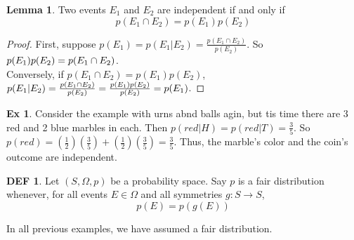 \documentclass{article}
\theoremstyle{definition}\newtheorem{definition}{DEF}
\theoremstyle{definition}\newtheorem{example}{Ex}
\theoremstyle{lemma}\newtheorem{lemma}{Lemma}
\theoremstyle{corrolary}\newtheorem{corrolary}{Cor}
\begin{document}
\begin{lemma}
Two events $E_1$ and $E_2$ are independent if and only if
\begin{equation}
p(E_1 \cap E_2) = p(E_1)p(E_2)
\end{equation}
\end{lemma}
\begin{proof}
First, suppose $p(E_1) = p(E_1 | E_2) = \frac{p(E_1 \cap E_2)}{p(E_2)}$.
So $p(E_1)p(E_2) = \\ p(E_1 \cap E_2)$. \\
Conversely, if $p(E_1 \cap E_2) = p(E_1)p(E_2)$, $p(E_1 | E_2) = \frac{p(E_1 \cap E_2)}{p(E_2)} \\= \frac{p(E_1)p(E_2)}{p(E_2)} = p(E_1)$.
\end{proof}

\begin{example}
Consider the example with urns abnd balls agin, but tis time there are 3 red and 2 blue marbles in each.
Then $p(red | H) = p(red | T) = \frac{3}{5}$.
So $p(red)=(\frac{1}{2})(\frac{3}{5})+(\frac{1}{2})(\frac{3}{5})=\frac{3}{5}$.
Thus, the marble's color and the coin's outcome are independent.
\end{example}

\begin{definition}
Let $(S, \Omega, p)$ be a probability space.
Say $p$ is a fair distribution whenever, for all events $E \in \Omega$ and all symmetries $g: S \rightarrow S$,
\begin{equation}
p(E) = p(g(E))
\end{equation}
\end{definition}

In all previous examples, we have assumed a fair distribution.
\end{document}
